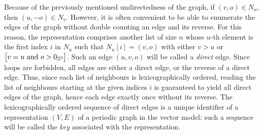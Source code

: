 \documentclass[main.tex]{subfiles}
\begin{document}
Because of the previously mentioned undirectedness of the graph, if $(v,o)\in N_u$, then $(u,-o)\in N_v$. However, it is often convenient to be able to enumerate the edges of the graph without double counting an edge and its reverse. For this reason, the representation comprises another list of size $n$ whose $u$-th element is the first index $i$ in $N_u$ such that $N_u[i] = (v,o)$ with either $v>u$ or $\big[ v = u\text{ and }o > 0_{\mathbb{Z}^3} \big]$. Such an edge $(u,v,o)$ will be called a \emph{direct} edge. Since loops are forbidden, all edges are either a direct edge, or the reverse of a direct edge. Thus, since each list of neighbours is lexicographically ordered, reading the list of neighbours starting at the given indices $i$ is guaranteed to yield all direct edges of the graph, hence each edge exactly once without its reverse. The lexicographically ordered sequence of direct edges is a unique identifier of a representation $(V,E)$ of a periodic graph in the vector model: such a sequence will be called the \emph{key} associated with the representation.
\end{document}
